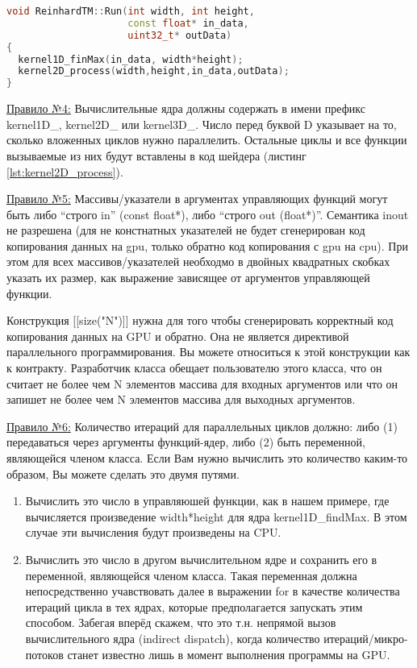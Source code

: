 \documentclass[11pt,fleqn,english,russian]{report} %
\begin{document}
\begin{lstlisting}[language=C++, 
	               caption=реализация управляющей функции вызывающей вычислительные ядра, 
	               label=lst:RunFunc]	
void ReinhardTM::Run(int width, int height, 
                     const float* in_data, 
                     uint32_t* outData)
{
  kernel1D_finMax(in_data, width*height);
  kernel2D_process(width,height,in_data,outData);
}
\end{lstlisting}

\underline{Правило №4:} Вычислительные ядра должны содержать в имени префикс kernel1D\_, kernel2D\_ или kernel3D\_. Число перед буквой D указывает на то, сколько вложенных циклов нужно параллелить. Остальные циклы и все функции вызываемые из них будут вставлены в код шейдера (листинг \ref{lst:kernel2D_process}). 

\underline{Правило №5:} Массивы/указатели в аргументах управляющих функций могут быть либо ``строго in'' (const float*), либо ``строго out (float*)''. Семантика inout не разрешена (для не констнатных указателей не будет сгенерирован код копирования данных на gpu, только обратно код копирования с gpu на cpu). При этом для всех массивов/указателей необходмо в двойных квадратных скобках указать их размер, как выражение зависящее от аргументов управляющей функции.  

\begin{remark}
Конструкция [[size("N")]] нужна для того чтобы сгенерировать корректный код копирования данных на GPU и обратно. Она не является директивой параллельного программирования. Вы можете относиться к этой конструкции как к контракту. Разработчик класса обещает пользователю этого класса, что он считает не более чем N элементов массива для входных аргументов или что он запишет не более чем N элементов массива для выходных аргументов. 
\end{remark}	

\underline{Правило №6:} Количество итераций для параллельных циклов должно: либо (1) передаваться через аргументы функций-ядер, либо (2) быть переменной, являющейся членом класса. Если Вам нужно вычислить это количество каким-то образом, Вы можете сделать это двумя путями.
\begin{enumerate}
\item Вычислить это число в управляюшей функции, как в нашем примере, где вычисляется произведение width*height для ядра kernel1D\_findMax. В этом случае эти вычисления будут произведены на CPU.
\item Вычислить это число в другом вычислительном ядре и сохранить его в переменной, являющейся членом класса. Такая переменная должна непосредственно учавствовать далее в выражении for в качестве количества итераций цикла в тех ядрах, которые предполагается запускать этим способом. Забегая вперёд скажем, что это т.н. непрямой вызов вычислительного ядра (indirect dispatch), когда количество итераций/микро-потоков станет известно лишь в момент выполнения программы на GPU. 
\end{enumerate}
\end{document}
